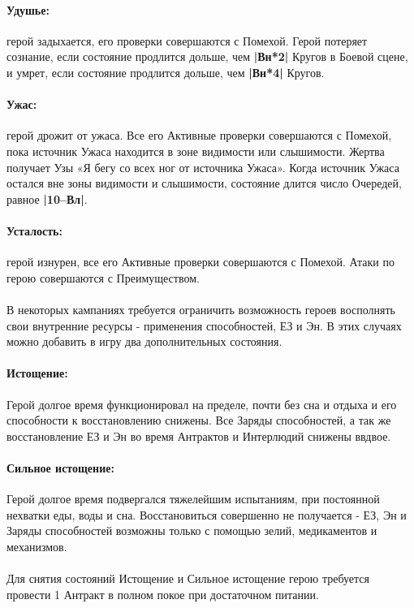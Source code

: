 \paragraph{Удушье:} герой задыхается, его проверки совершаются с Помехой. Герой потеряет сознание, если состояние продлится дольше, чем \textbf{|Вн*2|} Кругов в Боевой сцене, и умрет, если состояние продлится дольше, чем \textbf{|Вн*4|} Кругов.  
\paragraph{Ужас:} герой дрожит от ужаса. Все его Активные проверки совершаются с Помехой, пока источник Ужаса находится в зоне видимости или слышимости. Жертва получает Узы «Я бегу со всех ног от источника Ужаса».
\newline Когда источник Ужаса остался вне зоны видимости и слышимости, состояние длится число Очередей, равное \textbf{|10–Вл|}.
\paragraph{Усталость:} герой изнурен, все его Активные проверки совершаются с Помехой. Атаки по герою совершаются с Преимуществом.
\begin{tcolorbox}
\paragraph{} В некоторых кампаниях требуется ограничить возможность героев восполнять свои внутренние ресурсы - применения способностей, ЕЗ и Эн. В этих случаях можно добавить в игру два дополнительных состояния.
\paragraph{Истощение:} Герой долгое время функционировал на пределе, почти без сна и отдыха и его способности к восстановлению снижены. Все Заряды способностей, а так же восстановление ЕЗ и Эн во время Антрактов и Интерлюдий снижены ввдвое.
\paragraph{Сильное истощение:} Герой долгое время подвергался тяжелейшим испытаниям, при постоянной нехватки еды, воды и сна. Восстановиться совершенно не получается - ЕЗ, Эн и Заряды способностей возможны только с помощью зелий, медикаментов и механизмов.
\paragraph{} Для снятия состояний Истощение и Сильное истощение герою требуется провести 1 Антракт в полном покое при достаточном питании.
\end{tcolorbox}